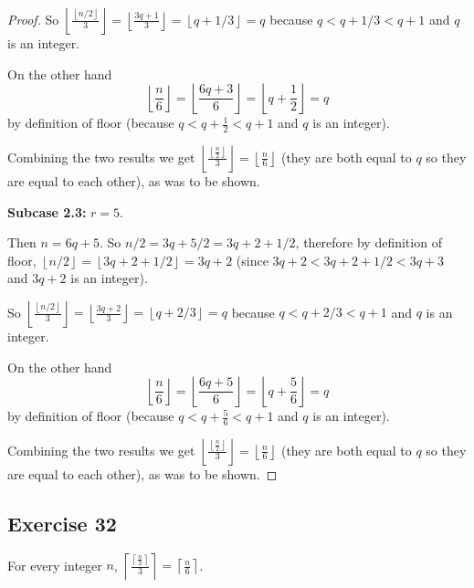 \documentclass[14pt]{extarticle}
\newcommand{\dps}{\displaystyle}
\newcommand{\floor}[1]{{\left\lfloor#1\right\rfloor}}
\newcommand{\ceil}[1]{{\left\lceil#1\right\rceil}}
\begin{document}
\begin{proof}
    So $\floor{\frac{\floor{n/2}}{3}} = \floor{\frac{3q+1}{3}} = \floor{q+1/3} = q$ because $q < q+1/3 < q+1$ and $q$ is an integer.

    On the other hand
    \[
        \floor{\frac{n}{6}} = \floor{\frac{6q+3}{6}} = \floor{q+\frac{1}{2}} = q
    \]
    by definition of floor (because $q < q+\frac{1}{2} < q+1$ and $q$ is an integer).

    Combining the two results we get $ \floor{\frac{\floor{\frac{n}{2}}}{3}} = \floor{\frac{n}{6}}$ (they are both equal to $q$ so they are equal to each other), as was to be shown.

        {\bf Subcase 2.3:} $r = 5$.

    Then $n = 6q+5$. So $n/2 = 3q+5/2 = 3q+2+1/2$, therefore by definition of floor, $\floor{n/2} = \floor{3q+2+1/2} = 3q+2$ (since $3q+2 < 3q+2+1/2< 3q+3$ and $3q+2$ is an integer).

    So $\floor{\frac{\floor{n/2}}{3}} = \floor{\frac{3q+2}{3}} = \floor{q+2/3} = q$ because $q < q+2/3 < q+1$ and $q$ is an integer.

    On the other hand
    \[
        \floor{\frac{n}{6}} = \floor{\frac{6q+5}{6}} = \floor{q+\frac{5}{6}} = q
    \]
    by definition of floor (because $q < q+\frac{5}{6} < q+1$ and $q$ is an integer).

    Combining the two results we get $ \floor{\frac{\floor{\frac{n}{2}}}{3}} = \floor{\frac{n}{6}}$ (they are both equal to $q$ so they are equal to each other), as was to be shown.
\end{proof}

\subsection{Exercise 32}
For every integer $n$, $\dps \ceil{\frac{\ceil{\frac{n}{2}}}{3}} = \ceil{\frac{n}{6}}$.
\end{document}
